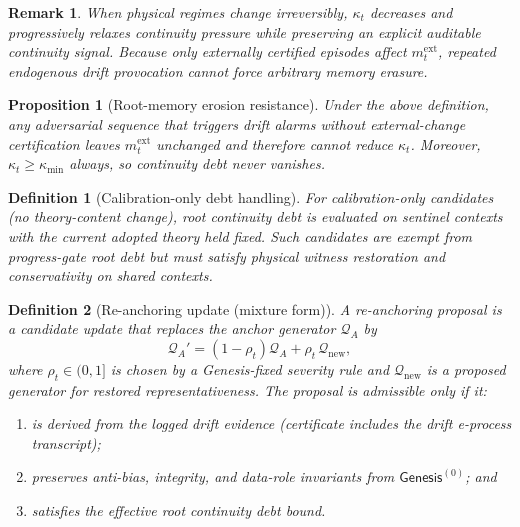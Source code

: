 \documentclass[11pt,a4paper]{article}
\newtheorem{proposition}[theorem]{Proposition}
\newtheorem{definition}{Definition}[section]
\newtheorem{remark}{Remark}[section]
\newcommand{\Gen}{\mathsf{Genesis}}
\begin{document}
\begin{remark}
When physical regimes change irreversibly, $\kappa_t$ decreases and progressively relaxes continuity pressure while preserving an explicit auditable continuity signal.
Because only externally certified episodes affect $m_t^{\mathrm{ext}}$, repeated endogenous drift provocation cannot force arbitrary memory erasure.
\end{remark}

\begin{proposition}[Root-memory erosion resistance]
Under the above definition, any adversarial sequence that triggers drift alarms without external-change certification leaves $m_t^{\mathrm{ext}}$ unchanged and therefore cannot reduce $\kappa_t$.
Moreover, $\kappa_t\ge\kappa_{\min}$ always, so continuity debt never vanishes.
\end{proposition}

\begin{definition}[Calibration-only debt handling]
For calibration-only candidates (no theory-content change), root continuity debt is evaluated on sentinel contexts with the current adopted theory held fixed.
Such candidates are exempt from progress-gate root debt but must satisfy physical witness restoration and conservativity on shared contexts.
\end{definition}

\begin{definition}[Re-anchoring update (mixture form)]
A re-anchoring proposal is a candidate update that replaces the anchor generator $\mathcal{Q}_A$ by
\[
\mathcal{Q}_A'=(1-\rho_t)\mathcal{Q}_A+\rho_t\,\mathcal{Q}_{\mathrm{new}},
\]
where $\rho_t\in(0,1]$ is chosen by a Genesis-fixed severity rule and $\mathcal{Q}_{\mathrm{new}}$ is a proposed generator for restored representativeness.
The proposal is admissible only if it:
\begin{enumerate}[leftmargin=*]
\item is derived from the logged drift evidence (certificate includes the drift e-process transcript);
\item preserves anti-bias, integrity, and data-role invariants from $\Gen^{(0)}$; and
\item satisfies the effective root continuity debt bound.
\end{enumerate}
\end{definition}
\end{document}
